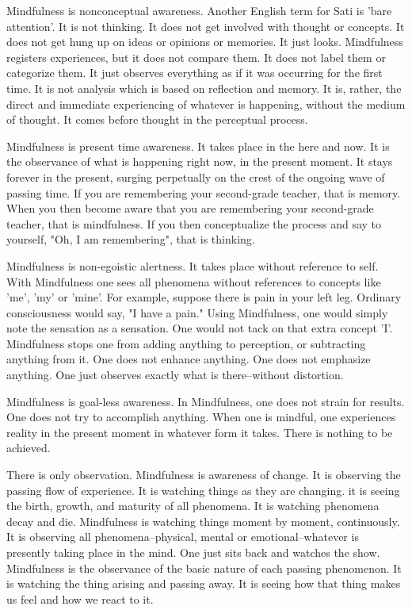 Mindfulness is nonconceptual awareness. Another English term for Sati is 'bare
attention'. It is not thinking. It does not get involved with thought or
concepts. It does not get hung up on ideas or opinions or memories. It just
looks. Mindfulness registers experiences, but it does not compare them. It does
not label them or categorize them. It just observes everything as if it was
occurring for the first time. It is not analysis which is based on reflection
and memory. It is, rather, the direct and immediate experiencing of whatever is
happening, without the medium of thought. It comes before thought in the
perceptual process.

Mindfulness is present time awareness. It takes place in the here and now. It is
the observance of what is happening right now, in the present moment. It stays
forever in the present, surging perpetually on the crest of the ongoing wave of
passing time. If you are remembering your second-grade teacher, that is memory.
When you then become aware that you are remembering your second-grade teacher, that is mindfulness. If you then conceptualize the process and
say to yourself, "Oh, I am remembering", that is thinking.

Mindfulness is non-egoistic alertness. It takes place without reference to self.
With Mindfulness one sees all phenomena without references to concepts like
'me', 'my' or 'mine'. For example, suppose there is pain in your left leg.
Ordinary consciousness would say, "I have a pain." Using Mindfulness, one would
simply note the sensation as a sensation. One would not tack on that extra
concept 'I'. Mindfulness stops one from adding anything to perception, or
subtracting anything from it. One does not enhance anything. One does not
emphasize anything. One just observes exactly what is there--without distortion.

Mindfulness is goal-less awareness. In Mindfulness, one does not strain for
results. One does not try to accomplish anything.
When one is mindful, one experiences reality in the present moment in whatever form it takes. There is nothing to be achieved.

There is only observation.
Mindfulness is awareness of change. It is observing the passing flow of experience. It is watching things as they are changing. it is
seeing the birth, growth, and maturity of all phenomena. It is watching phenomena decay and die. Mindfulness is watching things
moment by moment, continuously. It is observing all phenomena--physical, mental or emotional--whatever is presently taking
place in the mind. One just sits back and watches the show. Mindfulness is the observance of the basic nature of each passing
phenomenon. It is watching the thing arising and passing away. It is seeing how that thing makes us feel and how we react to it.


